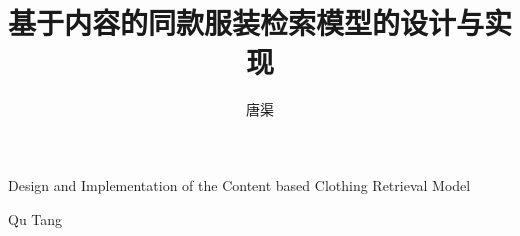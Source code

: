 \title{基于内容的同款服装检索模型的设计与实现}{}{Design and Implementation of the Content based Clothing Retrieval Model}{}
\author{唐渠}{Qu Tang}
\authorizedate{\today}
\makecover
